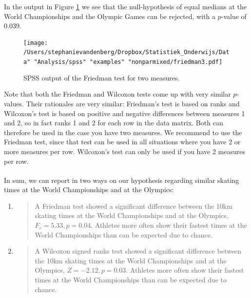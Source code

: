 \documentclass[]{report}\usepackage[]{graphicx}\usepackage[]{color}
\begin{document}
In the output in Figure \ref{fig:friedman3} we see that the null-hypothesis of equal medians at the World Championships and the Olympic Games can be rejected, with a $p$-value of 0.039.

\begin{figure}[h]
    \begin{center}
       \texttt{[image: /Users/stephanievandenberg/Dropbox/Statistiek\_Onderwijs/Data" "Analysis/spss" "examples" "nonparmixed/friedman3.pdf]}
    \end{center}
    \caption{SPSS output of the Friedman test for two measures.}
    \label{fig:friedman3}
\end{figure}



Note that both the Friedman and Wilcoxon tests come up with very similar $p$-values. Their rationales are very similar: Friedman's test is based on ranks and Wilcoxon's test is based on positive and negative differences between measures 1 and 2, so in fact ranks 1 and 2 for each row in the data matrix. Both can therefore be used in the case you have two measures. We recommend to use the Friedman test, since that test can be used in all situations where you have 2 or more measures per row. Wilcoxon's test can only be used if you have 2 measures per row.
\\
\\
In sum, we can report in two ways on our hypothesis regarding similar skating times at the World Championships and at the Olympics:

\begin{enumerate}

\item

\begin{quotation}
A Friedman test showed a significant difference between the 10km skating times at the World Championships and at the Olympics, $F_r = 5.33, p=0.04$. Athletes more often show their fastest times at the World Championships than can be expected due to chance.
\end{quotation}

\item

\begin{quotation}
A Wilcoxon signed ranks test showed a significant difference between the 10km skating times at the World Championships and at the Olympics, $Z = -2.12, p=0.03$. Athletes more often show their fastest times at the World Championships than can be expected due to chance.
\end{quotation}

\end{enumerate}
\end{document}
